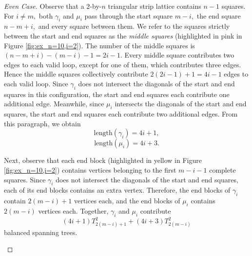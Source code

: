 \documentclass{amsart}
\theoremstyle{definition}
\begin{document}
\begin{proof}[Even Case]
    Observe that a $2$-by-$n$ triangular strip lattice contains $n-1$ squares. For $i\ne m,$ both $\gamma_i$ and $\mu_i$ pass through the start square $m-i,$ the end square $n-m+i,$ and every square between them. We refer to the squares strictly between the start and end squares as the \emph{middle squares} (highlighted in pink in Figure \ref{fig:ex_n=10,i=2}). The number of the middle squares is $(n-m+i)-(m-i)-1=2i-1.$ 
    Every middle square contributes two edges to each valid loop, except for one of them, which contributes three edges. Hence the middle squares collectively contribute $2(2i-1)+1=4i-1$ edges to each valid loop. Since $\gamma_i$ does not intersect the diagonals of the start and end squares in this configuration, the start and end squares each contribute one additional edge. Meanwhile, since $\mu_i$ intersects the diagonals of the start and end squares, the start and end squares each contribute two additional edges. From this paragraph, we obtain
    \[\text{length}(\gamma_i)=4i+1,\]
    \[\text{length}(\mu_i)=4i+3.\]

    Next, observe that each end block (highlighted in yellow in Figure \ref{fig:ex_n=10,i=2}) contains vertices belonging to the first $m-i-1$ complete squares. Since $\gamma_i$ does not intersect the diagonals of the start and end squares, each of its end blocks contains an extra vertex. Therefore, the end blocks of $\gamma_i$ contain $2(m-i)+1$ vertices each, and the end blocks of $\mu_i$ contains $2(m-i)$ vertices each. Together, $\gamma_i$ and $\mu_i$ contribute
    \[(4i+1)T_{2(m-i)+1}^2+(4i+3)T_{2(m-i)}^2\]
    balanced spanning trees.
    
    \begin{figure}[H]
        \centering
\end{figure}
\end{proof}
\end{document}
